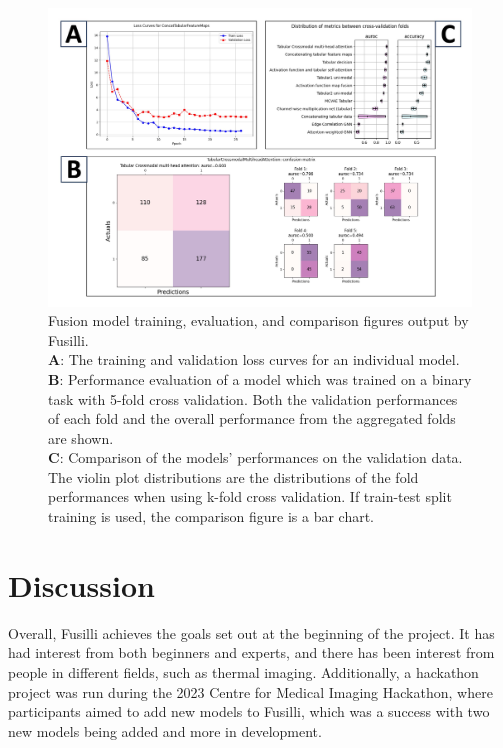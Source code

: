 \begin{figure}
    \centering
    \includegraphics[width=1\linewidth]{figures/fusilli_outputs}
    \caption{Fusion model training, evaluation, and comparison figures output by Fusilli. \\
    \textbf{A}: The training and validation loss curves for an individual model.\\
    \textbf{B}: Performance evaluation of a model which was trained on a binary task with 5-fold cross validation. Both the validation performances of each fold and the overall performance from the aggregated folds are shown. \\
    \textbf{C}: Comparison of the models' performances on the validation data. The violin plot distributions are the distributions of the fold performances when using k-fold cross validation. If train-test split training is used, the comparison figure is a bar chart.
    }
    \label{fig:fusillioutputs}
\end{figure}


\section{Discussion}

Overall, Fusilli achieves the goals set out at the beginning of the project.
It has had interest from both beginners and experts, and there has been interest from people in different fields, such as thermal imaging.
Additionally, a hackathon project was run during the 2023 Centre for Medical Imaging Hackathon, where participants aimed to add new models to Fusilli, which was a success with two new models being added and more in development.

